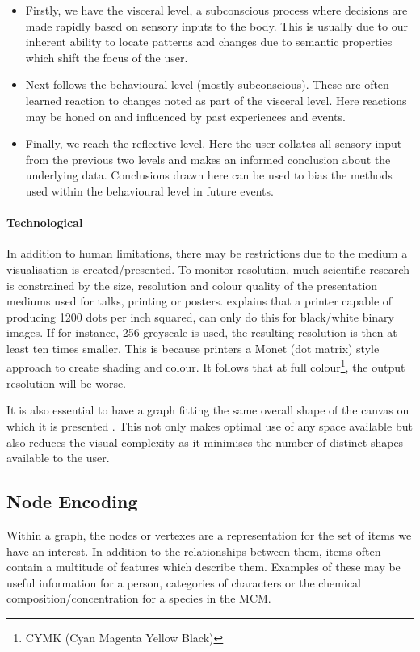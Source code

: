 \begin{itemize}
\item[1.] Firstly, we have the visceral level, a subconscious process where decisions are made rapidly based on sensory inputs to the body.
This is usually due to our inherent ability to locate patterns and changes due to semantic properties which shift the focus of the user.

\item[2.] Next follows the behavioural level (mostly subconscious). These are often learned reaction to changes noted as part of the visceral level. Here reactions may be honed on and influenced by past experiences and events.

\item[3.] Finally, we reach the reflective level. Here the user collates all sensory input from the previous two levels and makes an informed conclusion about the underlying data. Conclusions drawn here can be used to bias the methods used within the behavioural level in future events.
\end{itemize}

\paragraph{Technological}
In addition to human limitations, there may be restrictions due to the medium a visualisation is created/presented. To monitor resolution, much scientific research is constrained by the size, resolution and colour quality of the presentation mediums used for talks, printing or posters. \cite{ware} explains that a printer capable of producing 1200 dots per inch squared, can only do this for black/white binary images. If for instance, 256-greyscale is used, the resulting resolution is then at-least ten times smaller. This is because printers a Monet (dot matrix) style approach to create shading and colour. It follows that at full colour\footnote{CYMK (Cyan Magenta Yellow Black)}, the output resolution will be worse.

It is also essential to have a graph fitting the same overall shape of the canvas on which it is presented \citep{graphmetnew}. This not only makes optimal use of any space available but also reduces the visual complexity as it minimises the number of distinct shapes available to the user.









\subsection{Node Encoding}
Within a graph, the nodes or vertexes are a representation for the set of items we have an interest. In addition to the relationships between them, items often contain a multitude of features which describe them. Examples of these may be useful information for a person, categories of characters or the chemical composition/concentration for a species in the MCM.

